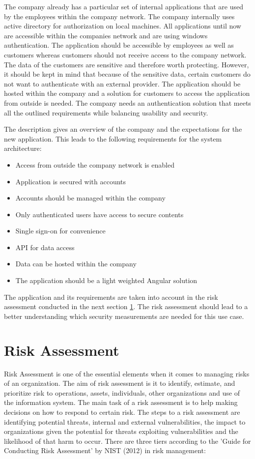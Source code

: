 The company already has a particular set of internal applications that are used by the employees within the company network. The company internally uses active directory for authorization on local machines. All applications until now are accessible within the companies network and are using windows authentication. The application should be accessible by employees as well as customers whereas customers should not receive access to the company network. The data of the customers are sensitive and therefore worth protecting. However, it should be kept in mind that because of the sensitive data, certain customers do not want to authenticate with an external provider. The application should be hosted within the company and a solution for customers to access the application from outside is needed. The company needs an authentication solution that meets all the outlined requirements while balancing usability and security. 

The description gives an overview of the company and the expectations for the new application. This leads to the following requirements for the system architecture:

\begin{itemize}
	\item Access from outside the company network is enabled
	\item Application is secured with accounts
	\item Accounts should be managed within the company
	\item Only authenticated users have access to secure contents
	\item Single sign-on for convenience
	\item API for data access
	\item Data can be hosted within the company
	\item The application should be a light weighted Angular solution
\end{itemize} 

The application and its requirements are taken into account in the risk assessment conducted in the next section \ref{riskassessment}. The risk assessment should lead to a better understanding which security measurements are needed for this use case.


\section{Risk Assessment}
\label{riskassessment}
Risk Assessment is one of the essential elements when it comes to managing risks of an organization. The aim of risk assessment is it to identify, estimate, and prioritize risk to operations, assets, individuals, other organizations and use of the information system. The main task of a risk assessment is to help making decisions on how to respond to certain risk. The steps to a risk assessment are identifying potential threats, internal and external vulnerabilities, the impact to organizations given the potential for threats exploiting vulnerabilities and the likelihood of that harm to occur. There are three tiers according to the 'Guide for Conducting Risk Assessment' by NIST (2012) in risk management:

